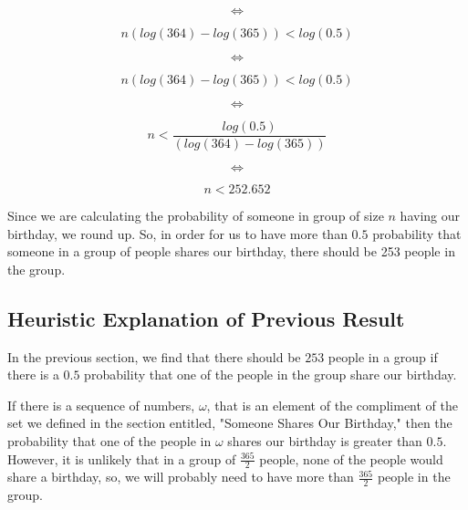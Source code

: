 \documentclass[a4paper,11pt]{article}
\begin{document}
\begin{equation}
\iff
\end{equation}

\begin{equation}
   n \left( log\left( 364 \right) -  log\left(365 \right) \right) <  
    log \left( 0.5 \right)
\end{equation}


\begin{equation}
\iff
\end{equation}

\begin{equation}
   n \left( log\left( 364 \right) -  log\left(365 \right) \right) <  
    log \left( 0.5 \right)
\end{equation}

\begin{equation}
\iff
\end{equation}

\begin{equation}
   n <  
    \frac
    {
      log \left( 0.5 \right){}
    }
    {
      \left( log\left( 364 \right) -  log\left(365 \right) \right){}
    }
\end{equation}

\begin{equation}
\iff
\end{equation}

\begin{equation}
   n < 252.652
\end{equation}

Since we are calculating the probability of someone in group of size $n$
having our birthday, we round up.  So, in order for us to have more than
$0.5$ probability that someone in a group of people shares our birthday,
there should be 253 people in the group.

\subsection{Heuristic Explanation of Previous Result}

In the previous section, we find that there should be $253$ people in a
group if there is a $0.5$ probability that one of the people in the
group share our birthday.

If there is a sequence of numbers, $\omega$, that is an element of the
compliment of the set we defined in the section entitled, "Someone 
Shares Our Birthday," then the probability that one of the people in
$\omega$ shares our birthday is greater than $0.5$.  However, it is
unlikely that in a group of $\frac{365}{2}$ people, none of the people
would share a birthday, so, we will probably need to have more than
$\frac{365}{2}$ people in the group.
\end{document}
